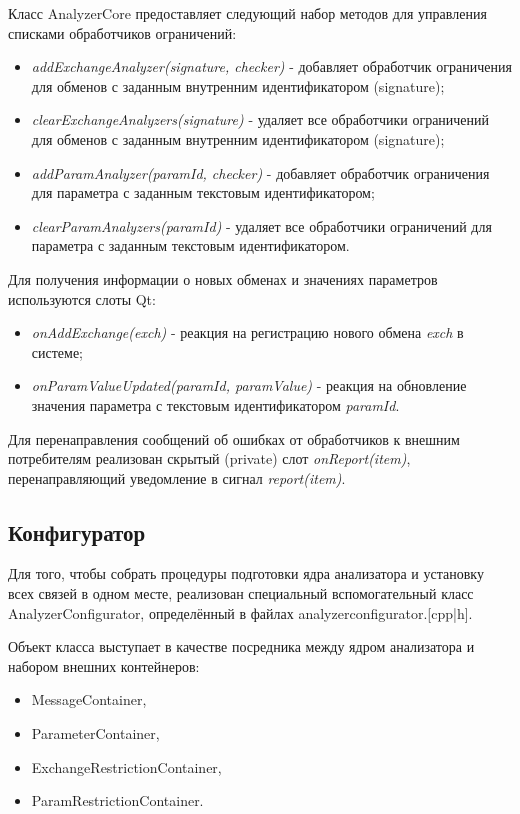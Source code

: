 Класс AnalyzerCore предоставляет следующий набор методов для управления 
списками обработчиков ограничений:

\begin{itemize}
 \item \textit{addExchangeAnalyzer(signature, checker)} - добавляет 
обработчик ограничения для обменов с заданным внутренним идентификатором 
(signature);
 \item \textit{clearExchangeAnalyzers(signature)} - удаляет все обработчики 
ограничений для обменов с заданным внутренним идентификатором (signature);
 \item \textit{addParamAnalyzer(paramId, checker)} - добавляет обработчик 
ограничения для параметра с заданным текстовым идентификатором;
 \item \textit{clearParamAnalyzers(paramId)} - удаляет все обработчики 
ограничений для параметра с заданным текстовым идентификатором.
\end{itemize}

Для получения информации о новых обменах и значениях параметров используются 
слоты Qt:

\begin{itemize}
 \item \textit{onAddExchange(exch)} - реакция на регистрацию нового обмена 
\textit{exch} в системе;
 \item \textit{onParamValueUpdated(paramId, paramValue)} - реакция на 
обновление значения параметра с текстовым идентификатором \textit{paramId}.
\end{itemize}

Для перенаправления сообщений об ошибках от обработчиков к внешним потребителям 
реализован скрытый (private) слот \textit{onReport(item)}, перенаправляющий 
уведомление в сигнал \textit{report(item)}.

\subsection*{Конфигуратор}

Для того, чтобы собрать процедуры подготовки ядра анализатора и установку всех 
связей в одном месте, реализован специальный вспомогательный класс 
AnalyzerConfigurator, определённый в файлах analyzerconfigurator.[cpp|h]. 

Объект класса выступает в качестве посредника между ядром анализатора 
и набором внешних контейнеров:

\begin{itemize}
 \item MessageContainer,
 \item ParameterContainer,
 \item ExchangeRestrictionContainer,
 \item ParamRestrictionContainer.
\end{itemize}

